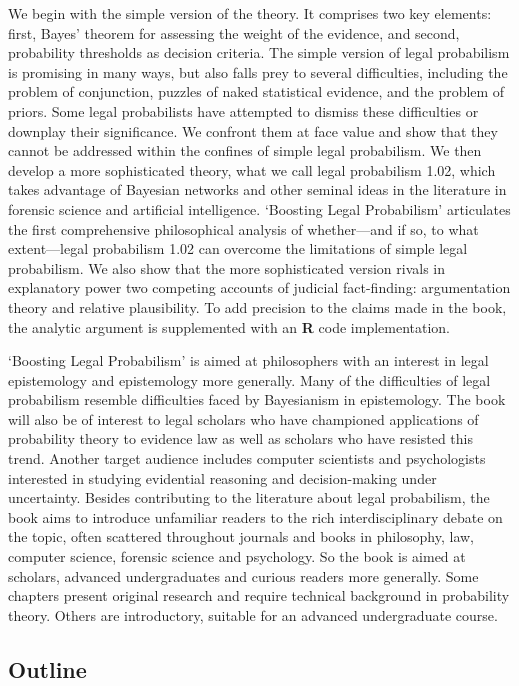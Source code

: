 \documentclass[
  10pt,
  dvipsnames,enabledeprecatedfontcommands]{scrartcl}
\begin{document}
We begin with the simple version of the theory. It comprises two key
elements: first, Bayes' theorem for assessing the weight of the
evidence, and second, probability thresholds as decision criteria. The
simple version of legal probabilism is promising in many ways, but also
falls prey to several difficulties, including the problem of
conjunction, puzzles of naked statistical evidence, and the problem of
priors. Some legal probabilists have attempted to dismiss these
difficulties or downplay their significance. We confront them at face
value and show that they cannot be addressed within the confines of
simple legal probabilism. We then develop a more sophisticated theory,
what we call legal probabilism 1.02, which takes advantage of Bayesian
networks and other seminal ideas in the literature in forensic science
and artificial intelligence. `Boosting Legal Probabilism' articulates
the first comprehensive philosophical analysis of whether---and if so,
to what extent---legal probabilism 1.02 can overcome the limitations of
simple legal probabilism. We also show that the more sophisticated
version rivals in explanatory power two competing accounts of judicial
fact-finding: argumentation theory and relative plausibility. To add
precision to the claims made in the book, the analytic argument is
supplemented with an \textbf{\textsf{R}} code implementation.

`Boosting Legal Probabilism' is aimed at philosophers with an interest
in legal epistemology and epistemology more generally. Many of the
difficulties of legal probabilism resemble difficulties faced by
Bayesianism in epistemology. The book will also be of interest to legal
scholars who have championed applications of probability theory to
evidence law as well as scholars who have resisted this trend. Another
target audience includes computer scientists and psychologists
interested in studying evidential reasoning and decision-making under
uncertainty. Besides contributing to the literature about legal
probabilism, the book aims to introduce unfamiliar readers to the rich
interdisciplinary debate on the topic, often scattered throughout
journals and books in philosophy, law, computer science, forensic
science and psychology. So the book is aimed at scholars, advanced
undergraduates and curious readers more generally. Some chapters present
original research and require technical background in probability
theory. Others are introductory, suitable for an advanced undergraduate
course.

\hypertarget{outline}{%
\subsection{Outline}\label{outline}}
\end{document}
